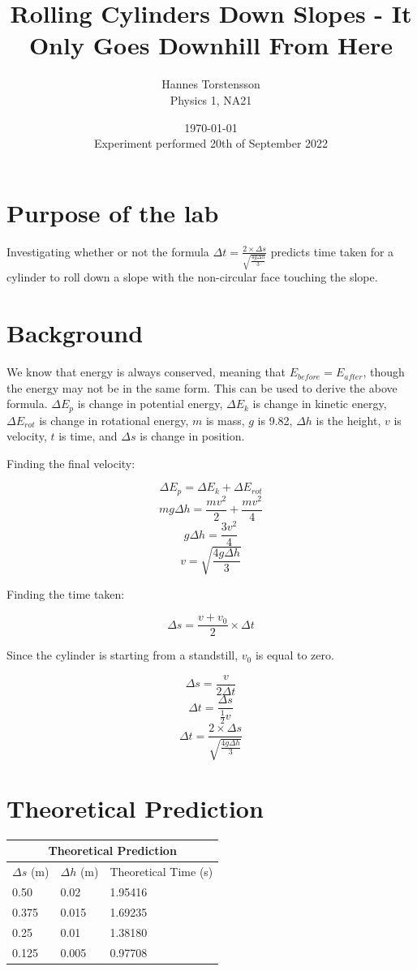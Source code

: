 \documentclass[twoside]{article}
\title{Rolling Cylinders Down Slopes - It Only Goes Downhill From Here}
\author{Hannes Torstensson \\ Physics 1, NA21}
\date{\today \\ Experiment performed 20th of September 2022}
\begin{document}
\maketitle

\section*{Purpose of the lab}
Investigating whether or not the formula $\Delta t = \frac{ 2 \times \Delta s }{ \sqrt{\frac{4 g \Delta h}{3}} } $ predicts time taken for a cylinder to roll down a slope with the non-circular face touching the slope.

\section*{Background}
We know that energy is always conserved, meaning that $E_{before} = E_{after}$, though the energy may not be in the same form. This can be used to derive the above formula. $\Delta E_{p}$ is change in potential energy, $\Delta E_{k}$ is change in kinetic energy, $\Delta E_{rot}$ is change in rotational energy, $m$ is mass, $g$ is 9.82, $\Delta h$ is the height, $v$ is velocity, $t$ is time, and $\Delta s$ is change in position.

\begin{multicols}{2}
\begin{center}
Finding the final velocity:

\end{center}
\[ \Delta E_{p} = \Delta E_{k} + \Delta E_{rot} \]
\[ mg \Delta h = \frac{mv^2}{2} + \frac{mv^2}{4} \]
\[ g \Delta h  = \frac{3v^2}{4} \]
\[ v = \sqrt{\frac{4g \Delta h}{3}} \] \break \break \break
\begin{center}
Finding the time taken:
\end{center}
\[ \Delta s = \frac{v+v_{0}}{2} \times \Delta t \]
\begin{center}
Since the cylinder is starting from a standstill, $v_{0}$ is equal to zero.
\end{center}
\[ \Delta s = \frac{v}{2 \Delta t} \]
\[ \Delta t = \frac{\Delta s}{\frac{1}{2}v} \]
\[ \Delta t = \frac{ 2 \times \Delta s }{ \sqrt{\frac{4 g \Delta h}{3}} } \]
\end{multicols}

\section*{Theoretical Prediction}
\begin{center}
	\begin{tabular}{ |p{3cm}|p{3cm}|p{3cm}| }
		\hline
			\multicolumn{3}{|c|}{Theoretical Prediction} \\
		\hline
			$\Delta s$ (m) & $\Delta h$ (m) & Theoretical Time (s) \\
		\hline
			0.50 & 0.02 & 1.95416 \\ \hline
			0.375 & 0.015 & 1.69235 \\ \hline
			0.25 & 0.01 & 1.38180 \\ \hline
			0.125 & 0.005 & 0.97708 \\ \hline
	\end{tabular}
\end{center}
\end{document}
